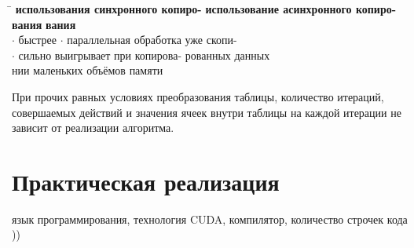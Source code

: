 \documentclass[a4paper,14pt,russian]{extreport}
\begin{document}
\begin{tabbing}
\hspace{0.5\textwidth} \= \hspace{0.5\textwidth} \kill
{\bf использования синхронного копиро-} \> {\bf использование асинхронного копиро-} \\
{\bf вания} \> {\bf вания} \\
$\cdot$ быстрее \> $\cdot$ параллельная обработка уже скопи- \\
$\cdot$ сильно выигрывает при копирова- \> рованных данных\\
нии маленьких объёмов памяти \>  
\end{tabbing}
\par
При прочих равных условиях преобразования таблицы, количество итераций, 
совершаемых действий и значения ячеек внутри таблицы на каждой итерации не зависит от реализации алгоритма. 

\chapter{Практическая реализация}  
язык программирования, технология CUDA, компилятор, количество строчек кода ))
\end{document}
